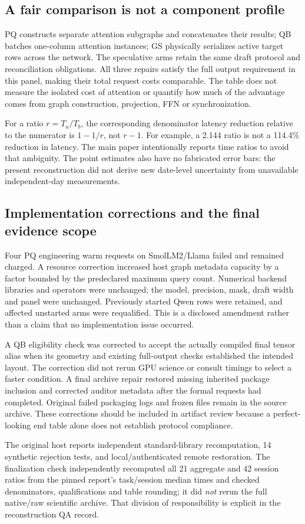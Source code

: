 \subsection{A fair comparison is not a component profile}
PQ constructs separate attention subgraphs and concatenates their results; QB batches one-column attention instances; GS physically serializes active target rows across the network. The speculative arms retain the same draft protocol and reconciliation obligations. All three repairs satisfy the full output requirement in this panel, making their total request costs comparable. The table does not measure the isolated cost of attention or quantify how much of the advantage comes from graph construction, projection, FFN or synchronization.

For a ratio $r=T_a/T_b$, the corresponding denominator latency reduction relative to the numerator is $1-1/r$, not $r-1$. For example, a 2.144 ratio is not a 114.4\% reduction in latency. The main paper intentionally reports time ratios to avoid that ambiguity. The point estimates also have no fabricated error bars: the present reconstruction did not derive new date-level uncertainty from unavailable independent-day measurements.

\subsection{Implementation corrections and the final evidence scope}
Four PQ engineering warm requests on SmolLM2/Llama failed and remained charged. A resource correction increased host graph metadata capacity by a factor bounded by the predeclared maximum query count. Numerical backend libraries and operators were unchanged; the model, precision, mask, draft width and panel were unchanged. Previously started Qwen rows were retained, and affected unstarted arms were requalified. This is a disclosed amendment rather than a claim that no implementation issue occurred.

A QB eligibility check was corrected to accept the actually compiled final tensor alias when its geometry and existing full-output checks established the intended layout. The correction did not rerun GPU science or consult timings to select a faster condition. A final archive repair restored missing inherited package inclusion and corrected auditor metadata after the formal requests had completed. Original failed packaging logs and frozen files remain in the source archive. These corrections should be included in artifact review because a perfect-looking end table alone does not establish protocol compliance.

The original host reports independent standard-library recomputation, 14 synthetic rejection tests, and local/authenticated remote restoration. The finalization check independently recomputed all 21 aggregate and 42 session ratios from the pinned report's task/session median times and checked denominators, qualifications and table rounding; it did \emph{not} rerun the full native/raw scientific archive. That division of responsibility is explicit in the reconstruction QA record.
